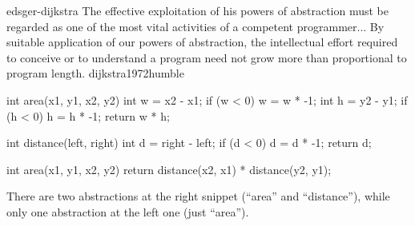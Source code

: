 \documentclass{article}
\begin{document}

\lnQuote
  {edsger-dijkstra}
  {The effective exploitation of his powers of abstraction must be regarded as one of the most vital activities of a competent programmer... By suitable application of our powers of abstraction, the intellectual effort required to conceive or to understand a program need not grow more than proportional to program length.}
  {dijkstra1972humble}

\begin{pptWide}{2}
{\small\begin{ffcode}
int area(x1, y1, x2, y2) {
  int w = x2 - x1;
  if (w < 0) { w = w * -1; }
  int h = y2 - y1;
  if (h < 0) { h = h * -1; }
  return w * h;
}
\end{ffcode}
}
\par\columnbreak\par
{\small\begin{ffcode}
int distance(left, right) {
  int d = right - left;
  if (d < 0) { d = d * -1; }
  return d;
}

int area(x1, y1, x2, y2) {
  return distance(x2, x1)
    * distance(y2, y1);
}
\end{ffcode}
}
\end{pptWide}\par
There are two abstractions at the right snippet (``area'' and ``distance''), while only one abstraction at the left one (just ``area'').
\plush{}
\end{document}
